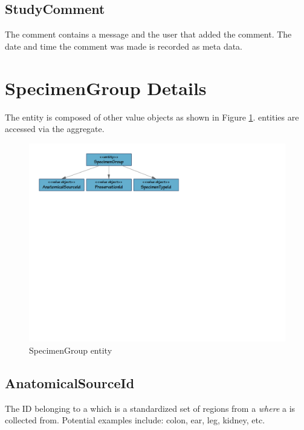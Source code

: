 \subsection*{StudyComment}

The comment contains a message and the user that added the comment. The date
and time the comment was made is recorded as meta data.

\section{SpecimenGroup Details}
\label{sec:specimen-group}

The  entity is
composed of other value objects as shown in Figure
\ref{fig:specimen-group}.  entities are accessed via
the  aggregate.

\begin{figure}[h]
  \centering
  \includegraphics[trim={9mm 162mm 80mm 9mm}, clip,
    width=1\textwidth]{images/specimen-group}
  \caption{SpecimenGroup entity}
  \label{fig:specimen-group}
\end{figure}

\subsection*{AnatomicalSourceId}

The ID belonging to a  which is a standardized set
of regions from a  \emph{where} a 
is collected from. Potential examples include: colon, ear, leg, kidney, etc.


